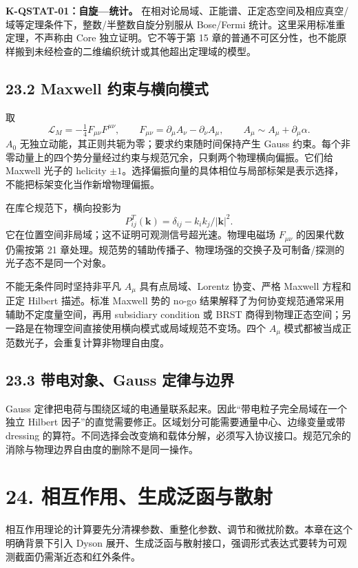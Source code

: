 \documentclass[
  11pt,
  oneside]{book}
\begin{document}
\textbf{K-QSTAT-01：自旋---统计。}
在相对论局域、正能谱、正定态空间及相应真空/域等定理条件下，整数/半整数自旋分别服从
Bose/Fermi 统计。这里采用标准重定理，不声称由 Core 独立证明。它不等于第
15
章的普通不可区分性，也不能原样搬到未经检查的二维编织统计或其他超出定理域的模型。

\section{23.2 Maxwell 约束与横向模式}

取 \[
\mathcal L_M=-\tfrac14F_{\mu\nu}F^{\mu\nu},\qquad
F_{\mu\nu}=\partial_\mu A_\nu-\partial_\nu A_\mu,
\qquad A_\mu\sim A_\mu+\partial_\mu\alpha.
\] \(A_0\) 无独立动能，其正则共轭为零；要求约束随时间保持产生 Gauss
约束。每个非零动量上的四个势分量经过约束与规范冗余，只剩两个物理横向偏振。它们给
Maxwell 光子的 helicity
\(\pm1\)。选择偏振向量的具体相位与局部标架是表示选择，不能把标架变化当作新增物理偏振。

在库仑规范下，横向投影为 \[
P^T_{ij}(\mathbf k)=\delta_{ij}-k_i k_j/|\mathbf k|^2.
\] 它在位置空间非局域；这不证明可观测信号超光速。物理电磁场
\(F_{\mu\nu}\) 的因果代数仍需按第 21
章处理。规范势的辅助传播子、物理场强的交换子及可制备/探测的光子态不是同一个对象。

不能无条件同时坚持非平凡 \(A_\mu\) 具有点局域、Lorentz 协变、严格
Maxwell 方程和正定 Hilbert 描述。标准 Maxwell 势的 no-go
结果解释了为何协变规范通常采用辅助不定度量空间，再用 subsidiary
condition 或 BRST
商得到物理正态空间；另一路是在物理空间直接使用横向模式或局域规范不变场。四个
\(A_\mu\) 模式都被当成正范数光子，会重复计算非物理自由度。

\section{23.3 带电对象、Gauss 定律与边界}

Gauss
定律把电荷与围绕区域的电通量联系起来。因此``带电粒子完全局域在一个独立
Hilbert 因子''的直觉需要修正。区域划分可能需要通量中心、边缘变量或带
dressing
的算符。不同选择会改变熵和载体分解，必须写入协议接口。规范冗余的消除与物理边界自由度的删除不是同一操作。

\chapter{24. 相互作用、生成泛函与散射}\label{ch-24}\hypertarget{ch-24}{}

相互作用理论的计算要先分清裸参数、重整化参数、调节和微扰阶数。本章在这个明确背景下引入
Dyson
展开、生成泛函与散射接口，强调形式表达式要转为可观测截面仍需渐近态和红外条件。
\end{document}
